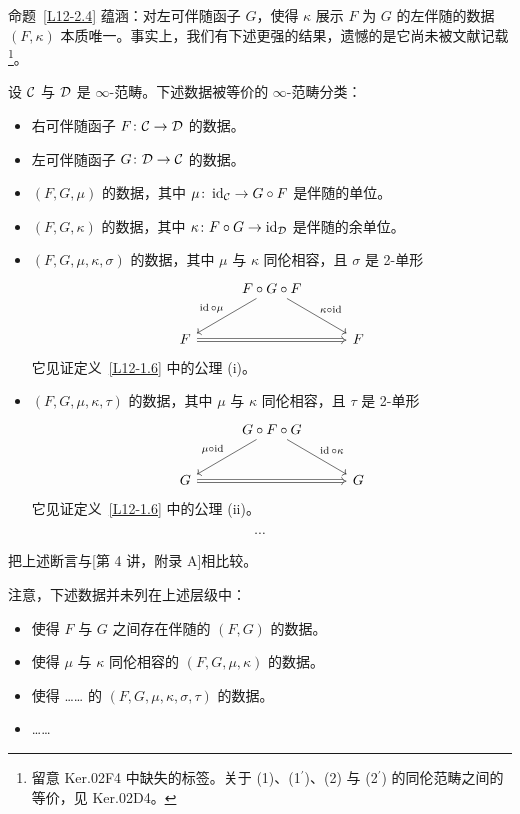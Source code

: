 \nitem\label{L12-3.1} 命题~\ref{L12-2.4} 蕴涵：对左可伴随函子 $G$，使得 $\kappa$ 展示 $F$ 为 $G$ 的左伴随的数据 $(F,\kappa)$ 本质唯一。事实上，我们有下述更强的结果，遗憾的是它尚未被文献记载\footnote{留意 Ker.02F4 中缺失的标签。关于 (1)、(1$^{\prime}$)、(2) 与 (2$^{\prime}$) 的同伦范畴之间的等价，见 Ker.02D4。}。

\begin{claim}\label{L12-3.2}
设 $\mathcal{C}$ 与 $\mathcal{D}$ 是 $\infty$-范畴。下述数据被等价的 $\infty$-范畴分类：
\begin{itemize}[leftmargin=3.2em,itemsep=0.3em,label={}]
\item[(1)] 右可伴随函子 $F\colon\mathcal{C}\to\mathcal{D}$ 的数据。
\item[(1$^{\prime}$)] 左可伴随函子 $G\colon\mathcal{D}\to\mathcal{C}$ 的数据。
\item[(2)] $(F,G,\mu)$ 的数据，其中 $\mu\colon\operatorname{id}_{\mathcal{C}}\to G\circ F$ 是伴随的单位。
\item[(2$^{\prime}$)] $(F,G,\kappa)$ 的数据，其中 $\kappa\colon F\circ G\to\operatorname{id}_{\mathcal{D}}$ 是伴随的余单位。
\item[(3)] $(F,G,\mu,\kappa,\sigma)$ 的数据，其中 $\mu$ 与 $\kappa$ 同伦相容，且 $\sigma$ 是 2-单形
\[
\begin{tikzcd}[column sep=2.8em,row sep=2.2em]
& F\circ G\circ F \arrow[dl,"\id\circ\mu"'] \arrow[dr,"\kappa\circ\id"] & \\
F \arrow[rr, Rightarrow] & & F
\end{tikzcd}
\]
它见证定义~\ref{L12-1.6} 中的公理 (i)。
\item[(3$^{\prime}$)] $(F,G,\mu,\kappa,\tau)$ 的数据，其中 $\mu$ 与 $\kappa$ 同伦相容，且 $\tau$ 是 2-单形
\[
\begin{tikzcd}[column sep=2.8em,row sep=2.2em]
& G\circ F\circ G \arrow[dl,"\mu\circ\id"'] \arrow[dr,"\id\circ\kappa"] & \\
G \arrow[rr, Rightarrow] & & G
\end{tikzcd}
\]
它见证定义~\ref{L12-1.6} 中的公理 (ii)。
\end{itemize}
\[\cdots\]
\end{claim}

\begin{exercise}\label{L12-3.3}
把上述断言与[第 4 讲，附录 A]相比较。
\end{exercise}

\begin{warning}\label{L12-3.4}
注意，下述数据并未列在上述层级中：
\begin{itemize}[leftmargin=2.2em,itemsep=0.1em]
\item 使得 $F$ 与 $G$ 之间存在伴随的 $(F,G)$ 的数据。
\item 使得 $\mu$ 与 $\kappa$ 同伦相容的 $(F,G,\mu,\kappa)$ 的数据。
\item 使得 …… 的 $(F,G,\mu,\kappa,\sigma,\tau)$ 的数据。
\item ……
\end{itemize}
\end{warning}


